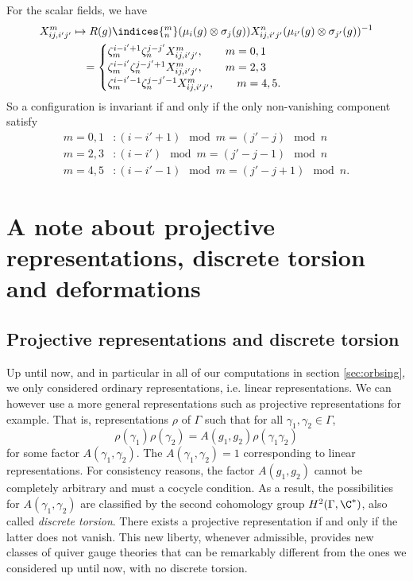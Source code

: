 \documentclass{worksheetclass}
\begin{document}
        For the scalar fields, we have
        \begin{align}
            X^m_{ij,i'j'}&\mapsto R(g)\indices{^m_n}(\mu_i(g)\otimes\sigma_j(g))X^n_{ij,i'j'}(\mu_{i'}(g)\otimes\sigma_{j'}(g))^{-1}\\
            &\quad =
            \begin{cases}
                \zeta^{i-i'+1}_m\zeta^{j-j'}_n X^m_{ij,i'j'},\qquad m=0,1\\
                \zeta^{i-i'}_m\zeta^{j-j'+1}_n X^m_{ij,i'j'},\qquad m=2,3\\
                \zeta^{i-i'-1}_m\zeta^{j-j'-1}_n X^m_{ij,i'j'},\qquad m=4,5.
            \end{cases}
        \end{align}
        So a configuration is invariant if and only if the only non-vanishing component satisfy
        \begin{align}
            m=0,1 &: (i-i'+1)\mod m = (j'-j)\mod n\\
            m=2,3 &: (i-i')\mod m = (j'-j-1)\mod n\\
            m=4,5 &: (i-i'-1)\mod m = (j'-j+1)\mod n.
        \end{align}

\section{A note about projective representations, discrete torsion and deformations}

    \subsection{Projective representations and discrete torsion}

        Up until now, and in particular in all of our computations in section \ref{sec:orbsing}, we only considered ordinary representations, i.e. linear representations. We can however use a more general representations such as projective representations for example. That is, representations $\rho$ of $\Gamma$ such that for all $\gamma_1,\gamma_2\in\Gamma$,
        \begin{equation}
            \rho(\gamma_1)\rho(\gamma_2)=A(g_1,g_2)\rho(\gamma_1\gamma_2)
        \end{equation}
        for some factor $A(\gamma_1,\gamma_2)$. The $A(\gamma_1,\gamma_2)=1$ corresponding to linear representations. For consistency reasons, the factor $A(g_1,g_2)$ cannot be completely arbitrary and must a cocycle condition. As a result, the possibilities for $A(\gamma_1,\gamma_2)$ are classified by the second cohomology group $H^2(\Gamma,\C^*)$, also called \emph{discrete torsion}. There exists a projective representation if and only if the latter does not vanish. This new liberty, whenever admissible, provides new classes of quiver gauge theories that can be remarkably different from the ones we considered up until now, with no discrete torsion.
\end{document}
